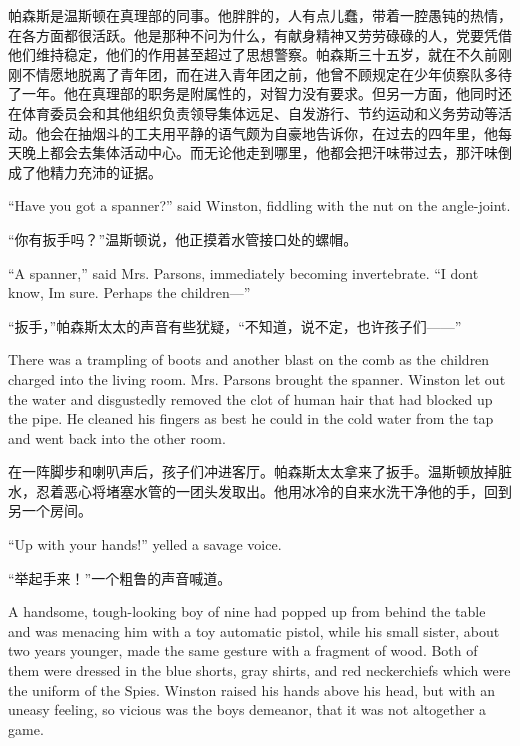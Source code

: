 \begin{paracol}{2}
\switchcolumn

帕森斯是温斯顿在真理部的同事。他胖胖的，人有点儿蠢，带着一腔愚钝的热情，在各方面都很活跃。他是那种不问为什么，有献身精神又劳劳碌碌的人，党要凭借他们维持稳定，他们的作用甚至超过了思想警察。帕森斯三十五岁，就在不久前刚刚不情愿地脱离了青年团，而在进入青年团之前，他曾不顾规定在少年侦察队多待了一年。他在真理部的职务是附属性的，对智力没有要求。但另一方面，他同时还在体育委员会和其他组织负责领导集体远足、自发游行、节约运动和义务劳动等活动。他会在抽烟斗的工夫用平静的语气颇为自豪地告诉你，在过去的四年里，他每天晚上都会去集体活动中心。而无论他走到哪里，他都会把汗味带过去，那汗味倒成了他精力充沛的证据。

\switchcolumn*

``Have you got a spanner?'' said Winston, fiddling with the nut on the
angle-joint.

\switchcolumn

``你有扳手吗？''温斯顿说，他正摸着水管接口处的螺帽。

\switchcolumn*

``A spanner,'' said Mrs. Parsons, immediately becoming invertebrate. ``I
don\textquotesingle t know, I\textquotesingle m sure. Perhaps the
children---''

\switchcolumn

``扳手，''帕森斯太太的声音有些犹疑，``不知道，说不定，也许孩子们——''

\switchcolumn*

There was a trampling of boots and another blast on the comb as the
children charged into the living room. Mrs. Parsons brought the spanner.
Winston let out the water and disgustedly removed the clot of human hair
that had blocked up the pipe. He cleaned his fingers as best he could in
the cold water from the tap and went back into the other room.

\switchcolumn

在一阵脚步和喇叭声后，孩子们冲进客厅。帕森斯太太拿来了扳手。温斯顿放掉脏水，忍着恶心将堵塞水管的一团头发取出。他用冰冷的自来水洗干净他的手，回到另一个房间。

\switchcolumn*

``Up with your hands!'' yelled a savage voice.

\switchcolumn

``举起手来！''一个粗鲁的声音喊道。

\switchcolumn*

A handsome, tough-looking boy of nine had popped up from behind the
table and was menacing him with a toy automatic pistol, while his small
sister, about two years younger, made the same gesture with a fragment
of wood. Both of them were dressed in the blue shorts, gray shirts, and
red neckerchiefs which were the uniform of the Spies. Winston raised his
hands above his head, but with an uneasy feeling, so vicious was the
boy\textquotesingle s demeanor, that it was not altogether a game.


\end{paracol}
